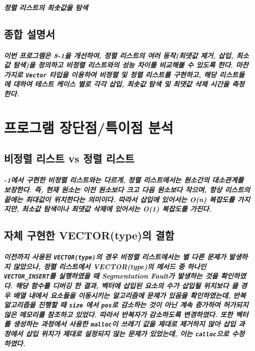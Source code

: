 \documentclass[UTF8, a4paper]{report}
\begin{document}
            \paragraph{%
                \normalfont 정렬 리스트의 최솟값을 탐색
            }

        \section{종합 설명서}

            \paragraph{%
                \normalfont 이번 프로그램은 8-1을 개선하여, 정렬 리스트의 여러 동작(최댓값 제거, 삽입, 최소값 탐색)을 정의하고 비정렬 리스트와의 성능 차이를 비교해볼 수 있도록 한다. 마찬가지로 \texttt{Vector} 타입을 이용하여 비정렬 및 정렬 리스트를 구현하고, 해당 리스트들에 대하여 테스트 케이스 별로 각각 삽입, 최솟값 탐색 및 최댓값 삭제 시간을 측정한다. 
            }
            
    \chapter{프로그램 장단점/특이점 분석}
            \section{비정렬 리스트 vs 정렬 리스트}
            \paragraph{%
                -1에서 구현한 비정렬 리스트와는 다르게, 정렬 리스트에서는 원소간의 대소관계를 보장한다. 즉, 현재 원소는 이전 원소보다 크고 다음 원소보다 작으며, 항상 리스트의 끝에는 최대값이 위치한다는 의미이다. 따라서 삽입에 있어서는 O(n) 복잡도를 가지지만, 최소값 탐색이나 최댓값 삭제에 있어서는 O(1) 복잡도를 가진다.
            }   

            \section{자체 구현한 VECTOR(type)의 결함}
            \paragraph{%
                \normalfont 이전까지 사용된 \texttt{VECTOR(type)}의 경우 비정렬 리스트에서는 별 다른 문제가 발생하지 않았으나, 정렬 리스트에서 VECTOR(type)의 메서드 중 하나인 \texttt{VECTOR\_INSERT}를 실행하였을 때 Segmentation Fault가 발생하는 것을 확인하였다. 해당 함수를 디버깅 한 결과, 벡터에 삽입된 요소의 수가 삽입될 위치보다 클 경우 배열 내에서 요소들을 이동시키는 알고리즘에 문제가 있음을 확인하였는데, 반복 알고리즘을 진행할 때  \texttt{size} 에서 \texttt{pos}로 감소하는 것이 아닌 계속 증가하여 허가되지 않은 메모리를 참조하고 있었다. 따라서 반복자가 감소하도록 변경하였다. 또한 벡터를 생성하는 과정에서 사용한 \texttt{malloc}이 쓰레기 값을 제대로 제거하지 않아 삽입 과정에서 삽입 위치가 제대로 설정되지 않는 문제가 있었는데, 이는 \texttt{calloc}으로 수정하였다. 
            }
\end{document}
